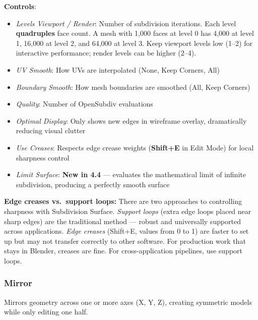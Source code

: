 \textbf{Controls}:
\begin{itemize}[leftmargin=2em]
  \item \textit{Levels Viewport / Render}: Number of subdivision iterations. Each level \textbf{quadruples} face count. A mesh with 1,000 faces at level 0 has 4,000 at level 1, 16,000 at level 2, and 64,000 at level 3. Keep viewport levels low (1--2) for interactive performance; render levels can be higher (2--4).
  \item \textit{UV Smooth}: How UVs are interpolated (None, Keep Corners, All)
  \item \textit{Boundary Smooth}: How mesh boundaries are smoothed (All, Keep Corners)
  \item \textit{Quality}: Number of OpenSubdiv evaluations
  \item \textit{Optimal Display}: Only shows new edges in wireframe overlay, dramatically reducing visual clutter
  \item \textit{Use Creases}: Respects edge crease weights (\textbf{Shift+E} in Edit Mode) for local sharpness control
  \item \textit{Limit Surface}: \textbf{New in 4.4} --- evaluates the mathematical limit of infinite subdivision, producing a perfectly smooth surface
\end{itemize}

\begin{tipbox}
\textbf{Edge creases vs.\ support loops:} There are two approaches to controlling sharpness with Subdivision Surface. \textit{Support loops} (extra edge loops placed near sharp edges) are the traditional method --- robust and universally supported across applications. \textit{Edge creases} (Shift+E, values from 0 to 1) are faster to set up but may not transfer correctly to other software. For production work that stays in Blender, creases are fine. For cross-application pipelines, use support loops.
\end{tipbox}

\subsubsection{Mirror}
\label{sec:mirror}

Mirrors geometry across one or more axes (X, Y, Z), creating symmetric models while only editing one half.

